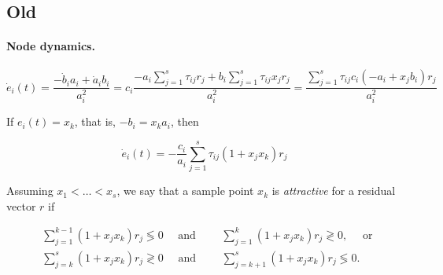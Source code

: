 \iffalse
\subsection{Old}





\paragraph{Node dynamics.}

\begin{equation}
\dot e_i(t) = \frac{-\dot b_i a_i + \dot a_i b_i}{a_i^2} = c_i\frac{- a_i \sum_
{j=1}^s
\tau_{ij} r_j + b_i \sum_
{j=1}^s \tau_{ij} x_j r_j}{a_i^2} = \frac{\sum_{j=1}^s \tau_{ij}c_i(-a_i
+x_j b_i)r_j}{a_i^2}
\end{equation}

If $e_i(t) = x_k$, that is, $-b_i = x_k a_i$, then

\begin{equation}
\dot e_i(t) = -\frac{c_i}{a_i}\sum_{j=1}^s \tau_{ij} (1
+ x_j x_k)r_j
\end{equation}

Assuming $x_1 < \ldots < x_s$, we say that a sample point $x_k$ is \emph{attractive} for a residual vector $r$ if

\begin{equation}
\begin{aligned}
    &\sum_{j=1}^{k-1} (1+x_j x_k) r_j \lessgtr 0 \quad \mbox{ and } \qquad \sum_{j=1}^k (1+x_j x_k) r_j \gtrless 0, \quad \mbox{ or }\\
    &\sum_{j=k}^s (1+x_j x_k) r_j \gtrless 0 \quad \mbox{ and } \qquad \sum_{j=k+1}^{s} (1+x_j x_k) r_j \lessgtr 0.\\
\end{aligned}
\end{equation}

